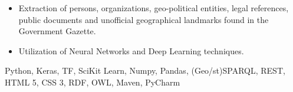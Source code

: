 \begin{experiences}
{\begin{itemize}
                      \item Extraction of persons, organizations, geo-political entities, legal references, public documents and unofficial geographical landmarks found in the Government Gazette.

                      \item Utilization of Neural Networks and Deep Learning techniques.
                    \end{itemize}
                    }
                    {Python, Keras, TF, SciKit Learn, Numpy, Pandas, (Geo/st)SPARQL, REST, HTML 5, CSS 3, RDF, OWL, Maven, PyCharm}
\end{experiences}
